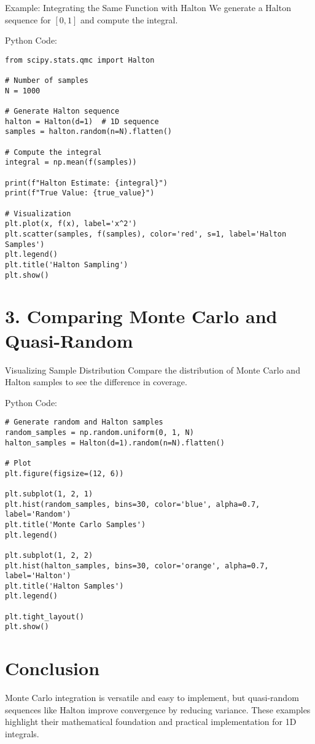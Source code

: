 \documentclass{article}
\begin{document}
 Example: Integrating the Same Function with Halton
We generate a Halton sequence for \([0, 1]\) and compute the integral.

 Python Code:
\begin{lstlisting}[caption=Integration with Halton Sequence]
from scipy.stats.qmc import Halton

# Number of samples
N = 1000

# Generate Halton sequence
halton = Halton(d=1)  # 1D sequence
samples = halton.random(n=N).flatten()

# Compute the integral
integral = np.mean(f(samples))

print(f"Halton Estimate: {integral}")
print(f"True Value: {true_value}")

# Visualization
plt.plot(x, f(x), label='x^2')
plt.scatter(samples, f(samples), color='red', s=1, label='Halton Samples')
plt.legend()
plt.title('Halton Sampling')
plt.show()
\end{lstlisting}

\section*{3. Comparing Monte Carlo and Quasi-Random}

 Visualizing Sample Distribution
Compare the distribution of Monte Carlo and Halton samples to see the difference in coverage.

Python Code:
\begin{lstlisting}[caption=Comparing Sample Distributions]
# Generate random and Halton samples
random_samples = np.random.uniform(0, 1, N)
halton_samples = Halton(d=1).random(n=N).flatten()

# Plot
plt.figure(figsize=(12, 6))

plt.subplot(1, 2, 1)
plt.hist(random_samples, bins=30, color='blue', alpha=0.7, label='Random')
plt.title('Monte Carlo Samples')
plt.legend()

plt.subplot(1, 2, 2)
plt.hist(halton_samples, bins=30, color='orange', alpha=0.7, label='Halton')
plt.title('Halton Samples')
plt.legend()

plt.tight_layout()
plt.show()
\end{lstlisting}

\section*{Conclusion}
Monte Carlo integration is versatile and easy to implement, but quasi-random sequences like Halton improve convergence by reducing variance. These examples highlight their mathematical foundation and practical implementation for 1D integrals.
\end{document}
